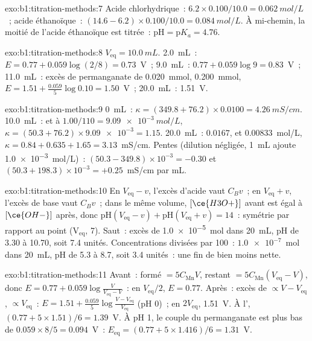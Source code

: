 \begin{solution}{exo:b1:titration-methods:7}
Acide chlorhydrique~: $6.2 \times 0.100/10.0 = \qty{0.062}{mol/L}$~;
acide éthanoïque~: $(14.6 - 6.2) \times 0.100/10.0 = \qty{0.084}{mol/L}$.
À mi-chemin, la moitié de l'acide éthanoïque est titrée~:
$\mathrm{pH} = \mathrm{p}K_a = 4.76$.
\end{solution}

\begin{solution}{exo:b1:titration-methods:8}
$V_{\mathrm{eq}} = \qty{10.0}{mL}$. 2.0~mL~: $E = 0.77 + 0.059\log(2/8) =
0.73$~V~; 9.0~mL~: $0.77 + 0.059\log 9 = 0.83$~V~; 11.0~mL~: excès de
permanganate de \qty{0.020}{mmol},  \qty{0.200}{mmol}, $E = 1.51 +
\frac{0.059}{5}\log 0.10 = 1.50$~V~; 20.0~mL~: 1.51~V.
\end{solution}

\begin{solution}{exo:b1:titration-methods:9}
0~mL~: $\kappa = (349.8 + 76.2) \times 0.0100 = \qty{4.26}{mS/cm}$.
10.0~mL~:  et  à $1.00/110 = \qty{9.09e-3}{mol/L}$,
$\kappa = (50.3 + 76.2) \times \num{9.09e-3} = 1.15$. 20.0~mL~: 
$0.0167$,  et  $0.00833$~mol/L, $\kappa = 0.84 + 0.635 + 1.65
= 3.13$~mS/cm. Pentes (dilution négligée, \qty{1}{mL} ajoute
\qty{1.0e-3}{mol/L})~: $(50.3 - 349.8) \times 10^{-3} = -0.30$ et
$(50.3 + 198.3) \times 10^{-3} = +0.25$~mS/cm par mL.
\end{solution}

\begin{solution}{exo:b1:titration-methods:10}
En $V_{\mathrm{eq}} - v$, l'excès d'acide vaut $C_Bv$~; en
$V_{\mathrm{eq}} + v$, l'excès de base vaut $C_Bv$~; dans le même
volume, $[\ce{H3O+}]$ avant est égal à
$[\ce{OH-}]$ après, donc $\mathrm{pH}(V_{\mathrm{eq}} - v) +
\mathrm{pH}(V_{\mathrm{eq}} + v) = 14$~: symétrie par rapport au point
(V$_{\mathrm{eq}}$,
7). Saut~: excès de \qty{1.0e-5}{mol} dans \qty{20}{mL}, pH de 3.30 à
10.70, soit 7.4 unités. Concentrations divisées par 100~:
$\num{1.0e-7}$~mol dans \qty{20}{mL}, pH de 5.3 à 8.7, soit 3.4
unités~: une fin de  bien moins nette.
\end{solution}

\begin{solution}{exo:b1:titration-methods:11}
Avant~:  formé $= 5C_{\mathrm{Mn}}V$,  restant $=
5C_{\mathrm{Mn}}(V_{\mathrm{eq}} - V)$, donc $E = 0.77 + 0.059\log\frac{V}{V_{\mathrm{eq}}
- V}$~: en $V_{\mathrm{eq}}/2$, $E = 0.77$. Après~: excès de  $\propto
V - V_{\mathrm{eq}}$,  $\propto V_{\mathrm{eq}}$~: $E = 1.51 +
\frac{0.059}{5}\log\frac{V - V_{\mathrm{eq}}}{V_{\mathrm{eq}}}$ (pH 0)~;
en $2V_{\mathrm{eq}}$, 1.51~V. À l',
$(0.77 + 5 \times 1.51)/6 =
1.39$~V. À pH 1, le couple du permanganate est plus bas de
$0.059 \times 8/5 =
0.094$~V~: $E_{\mathrm{eq}} = (0.77 + 5 \times 1.416)/6 = 1.31$~V.
\end{solution}

